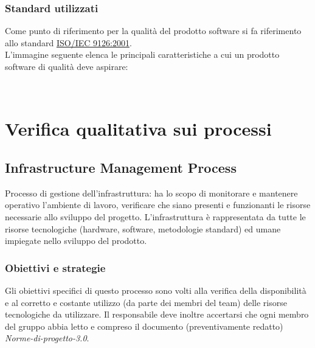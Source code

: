 \documentclass[a4paper,11pt]{article}
\begin{document}
\subsubsection{Standard utilizzati}
Come punto di riferimento per la qualità del prodotto software si fa riferimento allo standard \underline{ISO/IEC 9126:2001}.\\
L'immagine seguente elenca le principali caratteristiche a cui un prodotto software di qualità deve aspirare:\\
\vspace{6mm}
\noindent%
\begin{minipage}{\linewidth}%
\end{minipage}\\

\newpage
\section{Verifica qualitativa sui processi}

\subsection{Infrastructure Management Process}
Processo di gestione dell'infrastruttura: ha lo scopo di monitorare e mantenere operativo l'ambiente di lavoro, verificare che siano presenti e funzionanti le risorse necessarie allo sviluppo del progetto.
L'infrastruttura è rappresentata da tutte le risorse tecnologiche (hardware, software, metodologie standard) ed umane impiegate nello sviluppo del prodotto.

\subsubsection{Obiettivi e strategie}
Gli obiettivi specifici di questo processo sono volti alla verifica della disponibilità e al corretto e costante utilizzo (da parte dei membri del team) delle risorse tecnologiche da utilizzare. 
Il responsabile deve inoltre accertarsi che ogni membro del gruppo abbia letto e compreso il documento (preventivamente redatto) \textit{Norme-di-progetto-3.0}.
\end{document}

